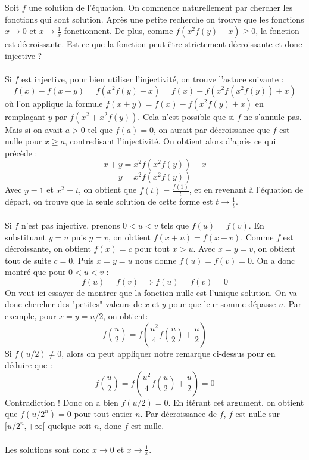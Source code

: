 \begin{sol}
Soit $f$ une solution de l'équation. On commence naturellement par chercher les fonctions qui sont solution. Après une petite recherche on trouve que les fonctions $x\rightarrow 0$ et $x\rightarrow \frac{1}{x}$ fonctionnent. De plus, comme $f(x^2f(y)+x)\ge 0$, la fonction est décroissante. Est-ce que la fonction peut être strictement décroissante et donc injective ? \\\\
Si $f$ est injective, pour bien utiliser l'injectivité, on trouve l'astuce suivante :
$$f(x)-f(x+y)=f(x^2f(y)+x)=f(x)-f(x^2f(x^2f(y))+x)$$
où l'on applique la formule $f(x+y)=f(x)-f(x^2f(y)+x)$ en remplaçant $y$ par $f(x^2+x^2f(y))$. Cela n'est possible que si $f$ ne s'annule pas. Mais si on avait $a>0$ tel que $f(a)=0$, on aurait par décroissance que $f$ est nulle pour $x\ge a$, contredisant l'injectivité. On obtient alors d'après ce qui précède :
$$x+y=x^2f(x^2f(y))+x$$
$$y=x^2f(x^2f(y))$$
Avec $y=1$ et $x^2=t$, on obtient que $f(t)=\frac{f(1)}{t}$, et en revenant à l'équation de départ, on trouve que la seule solution de cette forme est $t\rightarrow \frac{1}{t}$. \\\\
Si $f$ n'est pas injective, prenons $0<u<v$ tels que $f(u)=f(v)$. En substituant $y=u$ puis $y=v$, on obtient $f(x+u)=f(x+v)$. Comme $f$ est décroissante, on obtient $f(x)=c$ pour tout $x>u$. Avec $x=y=v$, on obtient tout de suite $c=0$. Puis $x=y=u$ nous donne $f(u)=f(v)=0$. On a donc montré que pour $0<u<v$ :
$$f(u)=f(v)\implies f(u)=f(v)=0$$
On veut ici essayer de montrer que la fonction nulle est l'unique solution. On va donc chercher des "petites" valeurs de $x$ et $y$ pour que leur somme dépasse $u$. Par exemple, pour $x=y=u/2$, on obtient:
$$f\left(\frac{u}{2}\right)=f\left(\frac{u^2}{4}f\left(\frac{u}{2}\right)+\frac{u}{2}\right)$$
Si $f(u/2)\ne 0$, alors on peut appliquer notre remarque ci-dessus pour en déduire que :
$$f\left(\frac{u}{2}\right)=f\left(\frac{u^2}{4}f\left(\frac{u}{2}\right)+\frac{u}{2}\right)=0$$
Contradiction ! Donc on a bien $f(u/2)=0$. En itérant cet argument, on obtient que $f(u/2^n)=0$ pour tout entier $n$. Par décroissance de $f$, $f$ est nulle sur $[u/2^n,+\infty[$ quelque soit $n$, donc $f$ est nulle. \\\\
Les solutions sont donc $x\rightarrow 0 $ et $x\rightarrow \frac{1}{x}$.
\end{sol}